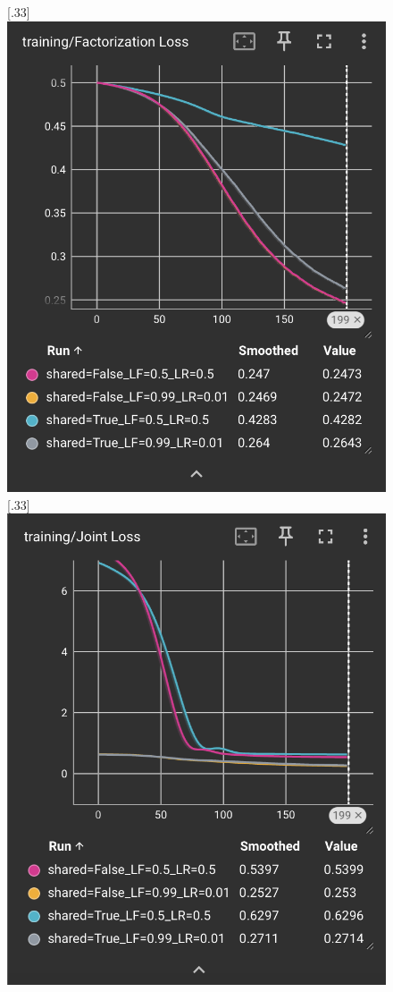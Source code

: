 \begin{figure}[H]
    [.33\linewidth]{%
        \includegraphics[width=\linewidth]{./figures/training_Factorization_Loss}%
    }
    [.33\linewidth]{%
        \includegraphics[width=\linewidth]{./figures/training_Joint_Loss}%
}
\end{figure}
